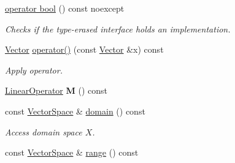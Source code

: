 \begin{DoxyCompactItemize}
\item 
\hyperlink{classSpacy_1_1DynamicOperator_a4d7243f9e135e01d4f87a0e21fe7cbe1}{operator bool} () const noexcept
\begin{DoxyCompactList}\small\item\em Checks if the type-\/erased interface holds an implementation. \end{DoxyCompactList}\item 
\hyperlink{classSpacy_1_1Vector}{Vector} \hyperlink{classSpacy_1_1DynamicOperator_ace2c2202ca6eb3fe5f5817087d30510a}{operator()} (const \hyperlink{classSpacy_1_1Vector}{Vector} \&x) const \hypertarget{classSpacy_1_1DynamicOperator_ace2c2202ca6eb3fe5f5817087d30510a}{}\label{classSpacy_1_1DynamicOperator_ace2c2202ca6eb3fe5f5817087d30510a}

\begin{DoxyCompactList}\small\item\em Apply operator. \end{DoxyCompactList}\item 
\hyperlink{classSpacy_1_1LinearOperator}{Linear\+Operator} {\bfseries M} () const \hypertarget{classSpacy_1_1DynamicOperator_a38c8c5337fd79a98a7e64139d0cbed38}{}\label{classSpacy_1_1DynamicOperator_a38c8c5337fd79a98a7e64139d0cbed38}

\item 
const \hyperlink{classSpacy_1_1VectorSpace}{Vector\+Space} \& \hyperlink{classSpacy_1_1DynamicOperator_ad457cb5571c721f97530895aa26af626}{domain} () const \hypertarget{classSpacy_1_1DynamicOperator_ad457cb5571c721f97530895aa26af626}{}\label{classSpacy_1_1DynamicOperator_ad457cb5571c721f97530895aa26af626}

\begin{DoxyCompactList}\small\item\em Access domain space $X$. \end{DoxyCompactList}\item 
const \hyperlink{classSpacy_1_1VectorSpace}{Vector\+Space} \& \hyperlink{classSpacy_1_1DynamicOperator_ab760994d921fa8d9df2882f9e4cfc9c3}{range} () const \hypertarget{classSpacy_1_1DynamicOperator_ab760994d921fa8d9df2882f9e4cfc9c3}{}\label{classSpacy_1_1DynamicOperator_ab760994d921fa8d9df2882f9e4cfc9c3}


\end{DoxyCompactItemize}
